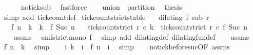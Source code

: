 \begin{isabellebody}
\ \ \ \ \isamarkupfalse%
\ no{\isacharunderscore}tick{\isacharunderscore}sub\ \isamarkupfalse%
\ fastforce\isanewline
\ \ \isamarkupfalse%
\ union\ \ partition\ \isamarkupfalse%
\ {\isacharquery}thesis\ \isamarkupfalse%
\ {\isacharparenleft}simp\ add{\isacharcolon}\ tick{\isacharunderscore}count{\isacharunderscore}def{\isacharparenright}\isanewline
{}\isamarkupfalse%
%
\endisatagproof
{\isafoldproof}%
%
\isadelimproof
\isanewline
%
\endisadelimproof
\isanewline
{}\isamarkupfalse%
\ tick{\isacharunderscore}count{\isacharunderscore}strict{\isacharunderscore}stable{\isacharcolon}\isanewline
\ \ \ {\isacartoucheopen}dilating\ f\ sub\ r{\isacartoucheclose}\isanewline
\ \ \ {\isacartoucheopen}{\isacharparenleft}f\ n{\isacharparenright}\ {\isacharless}\ k\ {\isasymand}\ k\ {\isacharless}\ {\isacharparenleft}f\ {\isacharparenleft}Suc\ n{\isacharparenright}{\isacharparenright}{\isacartoucheclose}\isanewline
\ \ \ {\isacartoucheopen}tick{\isacharunderscore}count{\isacharunderscore}strict\ r\ c\ k\ {\isacharequal}\ tick{\isacharunderscore}count{\isacharunderscore}strict\ r\ c\ {\isacharparenleft}f\ {\isacharparenleft}Suc\ n{\isacharparenright}{\isacharparenright}{\isacartoucheclose}\isanewline
%
\isadelimproof
%
\endisadelimproof
%
\isatagproof
{}\isamarkupfalse%
\ {\isacharminus}\isanewline
\ \ \isamarkupfalse%
\ assms{\isacharparenleft}{}{\isacharparenright}\ \isamarkupfalse%
\ smf{\isacharcolon}{\isacartoucheopen}strict{\isacharunderscore}mono\ f{\isacartoucheclose}\ \isamarkupfalse%
\ {\isacharparenleft}simp\ add{\isacharcolon}\ dilating{\isacharunderscore}def\ dilating{\isacharunderscore}fun{\isacharunderscore}def{\isacharparenright}\isanewline
\ \ \isamarkupfalse%
\ assms{\isacharparenleft}{}{\isacharparenright}\ \isamarkupfalse%
\ {\isacartoucheopen}f\ n\ {\isacharless}\ k{\isacartoucheclose}\ \isamarkupfalse%
\ simp\isanewline
\ \ \isamarkupfalse%
\ {\isacartoucheopen}{\isasymforall}i{\isachardot}\ k\ {\isasymle}\ i\ {\isasymlongrightarrow}\ f\ n\ {\isacharless}\ i{\isacartoucheclose}\ \isamarkupfalse%
\ simp\isanewline
\ \ \isamarkupfalse%
\ no{\isacharunderscore}tick{\isacharunderscore}before{\isacharunderscore}suc{\isacharbrackleft}OF\ assms{\isacharparenleft}{}{\isacharparenright}{\isacharbrackright}\ \isamarkupfalse%

\end{isabellebody}
